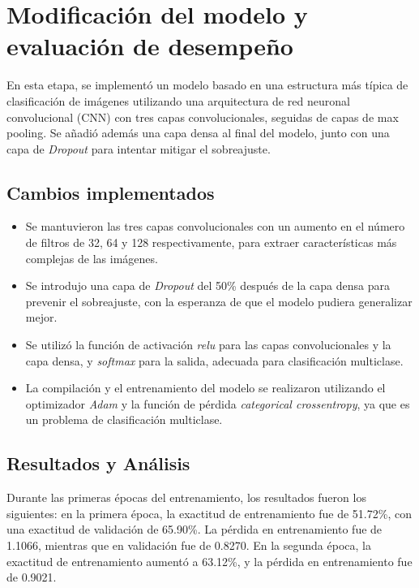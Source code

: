 \documentclass{article}
\begin{document}
\newpage

\section{Modificación del modelo y evaluación de desempeño}

En esta etapa, se implementó un modelo basado en una estructura más típica de clasificación de imágenes utilizando una arquitectura de red neuronal convolucional (CNN) con tres capas convolucionales, seguidas de capas de max pooling. Se añadió además una capa densa al final del modelo, junto con una capa de \textit{Dropout} para intentar mitigar el sobreajuste.

\subsection{Cambios implementados}

\begin{itemize}
	\item Se mantuvieron las tres capas convolucionales con un aumento en el número de filtros de 32, 64 y 128 respectivamente, para extraer características más complejas de las imágenes.
	\item Se introdujo una capa de \textit{Dropout} del 50\% después de la capa densa para prevenir el sobreajuste, con la esperanza de que el modelo pudiera generalizar mejor.
	\item Se utilizó la función de activación \textit{relu} para las capas convolucionales y la capa densa, y \textit{softmax} para la salida, adecuada para clasificación multiclase.
	\item La compilación y el entrenamiento del modelo se realizaron utilizando el optimizador \textit{Adam} y la función de pérdida \textit{categorical crossentropy}, ya que es un problema de clasificación multiclase.
\end{itemize}

\subsection{Resultados y Análisis}

Durante las primeras épocas del entrenamiento, los resultados fueron los siguientes: en la primera época, la exactitud de entrenamiento fue de 51.72\%, con una exactitud de validación de 65.90\%. La pérdida en entrenamiento fue de 1.1066, mientras que en validación fue de 0.8270. En la segunda época, la exactitud de entrenamiento aumentó a 63.12\%, y la pérdida en entrenamiento fue de 0.9021.
\\
\end{document}

